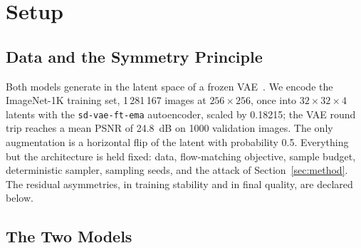 \documentclass{article}
\begin{document}
\section{Setup}\label{sec:setup}

\subsection{Data and the Symmetry Principle}

Both models generate in the latent space of a frozen VAE~\cite{rombach2022high}. We encode the ImageNet-1K training set, 1\,281\,167 images at $256{\times}256$, once into $32{\times}32{\times}4$ latents with the \texttt{sd-vae-ft-ema} autoencoder, scaled by 0.18215; the VAE round trip reaches a mean PSNR of 24.8~dB on 1000 validation images. The only augmentation is a horizontal flip of the latent with probability 0.5. Everything but the architecture is held fixed: data, flow-matching objective, sample budget, deterministic sampler, sampling seeds, and the attack of Section~\ref{sec:method}. The residual asymmetries, in training stability and in final quality, are declared below.

\subsection{The Two Models}
\end{document}
